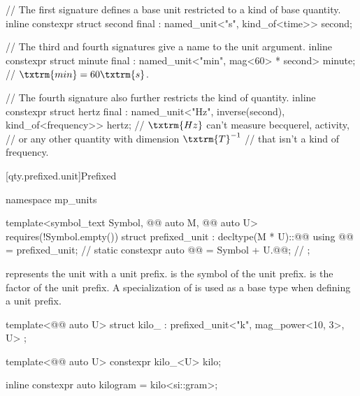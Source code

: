 \pnum
\begin{example}
\begin{codeblock}
// The first signature defines a base unit restricted to a kind of base quantity.
inline constexpr struct second final : named_unit<"s", kind_of<time>> {
} second;

// The third and fourth signatures give a name to the unit argument.
inline constexpr struct minute final : named_unit<"min", mag<60> * second> {
} minute;  // $\txtrm{min} = 60 \txtrm{ s}$.

// The fourth signature also further restricts the kind of quantity.
inline constexpr struct hertz final : named_unit<"Hz", inverse(second), kind_of<frequency>> {
} hertz;  // $\txtrm{Hz}$ can't measure becquerel, activity,
          // or any other quantity with dimension $\txtrm{T}^{-1}$
          // that isn't a kind of frequency.
\end{codeblock}
\end{example}

[qty.prefixed.unit]{Prefixed}

\begin{codeblock}
namespace mp_units {

template<symbol_text Symbol, @@ auto M, @@ auto U>
  requires(!Symbol.empty())
struct prefixed_unit : decltype(M * U)::@@ {
  using @@ = prefixed_unit;                   // \expos
  static constexpr auto @@ = Symbol + U.@@;  // \expos
};

}
\end{codeblock}

\pnum
{} represents the unit  with a unit prefix.
 is the symbol of the unit prefix.
 is the factor of the unit prefix.
A specialization of  is used as a base type when defining a unit prefix.
\begin{example}
\begin{codeblock}
template<@@ auto U>
struct kilo_ : prefixed_unit<"k", mag_power<10, 3>, U> {};

template<@@ auto U>
constexpr kilo_<U> kilo;

inline constexpr auto kilogram = kilo<si::gram>;
\end{codeblock}
\end{example}

